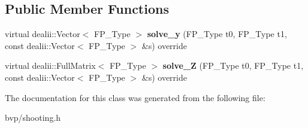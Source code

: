 \subsection*{Public Member Functions}
\begin{DoxyCompactItemize}
\item 
\mbox{\label{classSF__External_ab156d1b3064f97dfafb2b94f6a86dd88}} 
virtual dealii\+::\+Vector$<$ F\+P\+\_\+\+Type $>$ {\bfseries solve\+\_\+y} (F\+P\+\_\+\+Type t0, F\+P\+\_\+\+Type t1, const dealii\+::\+Vector$<$ F\+P\+\_\+\+Type $>$ \&s) override
\item 
\mbox{\label{classSF__External_aa200b549afa92b96cd50b4adf3635f06}} 
virtual dealii\+::\+Full\+Matrix$<$ F\+P\+\_\+\+Type $>$ {\bfseries solve\+\_\+Z} (F\+P\+\_\+\+Type t0, F\+P\+\_\+\+Type t1, const dealii\+::\+Vector$<$ F\+P\+\_\+\+Type $>$ \&s) override
\end{DoxyCompactItemize}


The documentation for this class was generated from the following file\+:\begin{DoxyCompactItemize}
\item 
bvp/shooting.\+h\end{DoxyCompactItemize}
